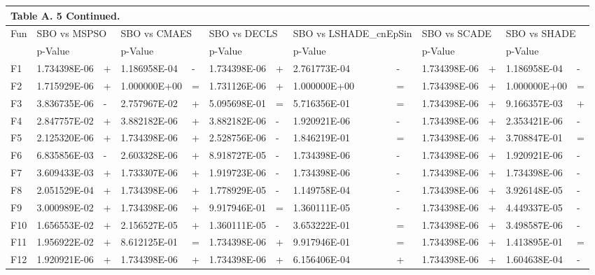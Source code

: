 \documentclass{article} %
\begin{document}
\begin{tabular}{|p{0.3in}|p{0.6in}|p{0.2in}|p{0.6in}|p{0.2in}|p{0.6in}|p{0.2in}|p{0.7in}|p{0.2in}|p{0.6in}|p{0.2in}|p{0.6in}|p{0.2in}|} \hline 
\multicolumn{13}{|p{1in}|}{Table A. 5 Continued.} \\ \hline 
Fun & \multicolumn{2}{|p{0.8in}|}{SBO vs MSPSO} & \multicolumn{2}{|p{0.8in}|}{SBO vs CMAES} & \multicolumn{2}{|p{0.8in}|}{SBO vs DECLS} & \multicolumn{2}{|p{0.9in}|}{SBO vs LSHADE\_cnEpSin} & \multicolumn{2}{|p{0.8in}|}{SBO vs SCADE} & \multicolumn{2}{|p{0.8in}|}{SBO vs SHADE} \\ \hline 
 & p-Value &  & p-Value &  & p-Value &  & p-Value &  & p-Value &  & p-Value &  \\ \hline 
F1 & 1.734398E-06 & + & 1.186958E-04 & - & 1.734398E-06 & + & 2.761773E-04 & - & 1.734398E-06 & + & 1.186958E-04 & - \\ \hline 
F2 & 1.715929E-06 & + & 1.000000E+00 & = & 1.731126E-06 & + & 1.000000E+00 & = & 1.734398E-06 & + & 1.000000E+00 & = \\ \hline 
F3 & 3.836735E-06 & - & 2.757967E-02 & + & 5.095698E-01 & = & 5.716356E-01 & = & 1.734398E-06 & + & 9.166357E-03 & + \\ \hline 
F4 & 2.847757E-02 & + & 3.882182E-06 & + & 3.882182E-06 & - & 1.920921E-06 & - & 1.734398E-06 & + & 2.353421E-06 & - \\ \hline 
F5 & 2.125320E-06 & + & 1.734398E-06 & + & 2.528756E-06 & - & 1.846219E-01 & = & 1.734398E-06 & + & 3.708847E-01 & = \\ \hline 
F6 & 6.835856E-03 & - & 2.603328E-06 & + & 8.918727E-05 & - & 1.734398E-06 & - & 1.734398E-06 & + & 1.920921E-06 & - \\ \hline 
F7 & 3.609433E-03 & + & 1.733307E-06 & + & 1.919723E-06 & - & 1.734398E-06 & - & 1.734398E-06 & + & 1.734398E-06 & - \\ \hline 
F8 & 2.051529E-04 & + & 1.734398E-06 & + & 1.778929E-05 & - & 1.149758E-04 & - & 1.734398E-06 & + & 3.926148E-05 & - \\ \hline 
F9 & 3.000989E-02 & + & 1.734398E-06 & + & 9.917946E-01 & = & 1.360111E-05 & - & 1.734398E-06 & + & 4.449337E-05 & - \\ \hline 
F10 & 1.656553E-02 & + & 2.156527E-05 & + & 1.360111E-05 & - & 3.653222E-01 & = & 1.734398E-06 & + & 3.498587E-06 & - \\ \hline 
F11 & 1.956922E-02 & + & 8.612125E-01 & = & 1.734398E-06 & + & 9.917946E-01 & = & 1.734398E-06 & + & 1.413895E-01 & = \\ \hline 
F12 & 1.920921E-06 & + & 1.734398E-06 & + & 1.734398E-06 & + & 6.156406E-04 & + & 1.734398E-06 & + & 1.604638E-04 & - \\ \hline 

\end{tabular}
\end{document}
